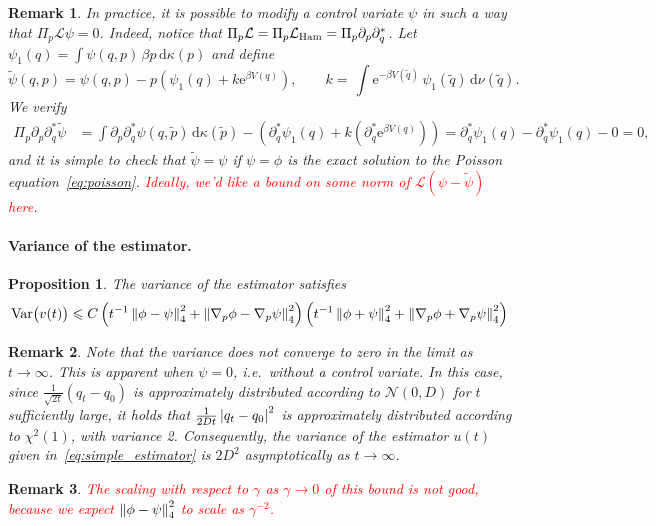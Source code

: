 \documentclass[11pt,a4paper]{article}
\newcommand{\e}{\mathrm{e}}
\newcommand{\grad}{\nabla}
\renewcommand{\d}{\mathrm d}
\theoremstyle{plain}
\newtheorem{proposition}{Proposition}[section]
\newtheorem{remark}{Remark}[section]
\numberwithin{equation}{section}
\renewcommand{\leq}{\leqslant}
\begin{document}
\begin{remark}
    In practice, it is possible to modify a control variate $\psi$ in such a way that $\Pi_p \mathcal L \psi = 0$.
    Indeed, notice that $\Pi_p \mathcal L = \Pi_p \mathcal L_{\rm Ham} =  \Pi_p \partial_p \partial_q^*$.
    Let $\psi_1(q) = \int \psi(q,p) \, \beta p \, \d \kappa(p)$ and define
    \[
        \widetilde \psi(q,p)
        = \psi(q,p) - p \left(  \psi_1(q) + k \e^{\beta V(q)}   \right),
        \qquad k = \, \int \e^{- \beta V(\widetilde q)} \, \psi_1(\widetilde q) \, \d \nu(\widetilde q).
    \]
    We verify
    \begin{align*}
        \Pi_p \partial_p \partial_q^* \widetilde \psi
        &= \int \partial_p \partial_q^* \psi(q, \widetilde p) \, \d \kappa(\widetilde p)
        -  \left(\partial_q^*\psi_1(q) +  k \left( \partial_q^* \e^{\beta V(q)} \right) \right)
        = \partial_q^*\psi_1(q) - \partial_q^*\psi_1(q) - 0 = 0,
    \end{align*}
    and it is simple to check that $\widetilde \psi = \psi$
    if $\psi = \phi$ is the exact solution to the Poisson equation~\eqref{eq:poisson}.
    \textcolor{red}{Ideally, we'd like a bound on some norm of $\mathcal L (\psi - \widetilde \psi)$ here}.
\end{remark}

\paragraph{Variance of the estimator.}%

\begin{proposition}
    The variance of the estimator satisfies
    \begin{equation}
        \label{eq:variance_estimator}
        \mathrm{Var} \bigl(v(t)\bigr)
        \leq
        C \left( t^{-1} \norm{\phi - \psi}[4]^2  + \norm{\grad_p \phi - \grad_p \psi}[4]^2 \right)
        \left( t^{-1} \norm{\phi + \psi}[4]^2  + \norm{\grad_p \phi + \grad_p \psi}[4]^2 \right)
    \end{equation}
\end{proposition}
\begin{remark}
    Note that the variance does not converge to zero in the limit as $t \to \infty$.
    This is apparent when $\psi = 0$,
    i.e.\ without a control variate.
    In this case,
    since $\frac{1}{\sqrt{2 t}}(q_t - q_0)$ is approximately distributed according to $\mathcal N(0, D)$ for $t$ sufficiently large,
    it holds that $\frac{1}{2D t} \abs{q_t - q_0}^2$ is approximately distributed according to $\chi^2(1)$,
    with variance 2.
    Consequently, the variance of the estimator $u(t)$ given in~\eqref{eq:simple_estimator} is $2D^2$ asymptotically as $t \to \infty$.
\end{remark}
\begin{remark}
    \textcolor{red}{The scaling with respect to $\gamma$ as $\gamma \to 0$ of this bound is not good,
        because we expect $\norm{\phi - \psi}[4]^2$ to scale as $\gamma^{-2}$.
    }
\end{remark}
\end{document}
